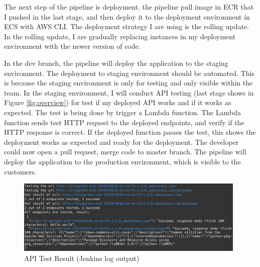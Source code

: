 \par
\label{deploy}
The next step of the pipeline is deployment, the pipeline pull image in ECR that I pushed in the last stage, and then deploy it to the deployment environment in ECS with AWS CLI. The deployment strategy I are using is the rolling update. In the rolling update, I are gradually replacing instances in my deployment environment with the newer version of code.
\par
In the dev branch, the pipeline will deploy the application to the staging environment. The deployment to staging environment should be automated. This is because the staging environment is only for testing and only visible within the team. 
In the staging environment, I will conduct API testing (last stage shows in Figure \ref{fig:overview}) for test if my deployed API works and if it works as expected. The test is being done by trigger a Lambda function. The Lambda function sends test HTTP request to the deployed endpoints, and verify if the HTTP response is correct. If the deployed function passes the test, this shows the deployment works as expected and ready for the deployment. The developer could now open a pull request, merge code to master branch. The pipeline will deploy the application to the production environment, which is visible to the customers.
\begin{figure}[h]
     \centering
     \includegraphics[width=0.98\textwidth]{pics/test_result.png}
     \caption{API Test Result (Jenkins log output)}
     \label{fig:test-result}
    \end{figure}
